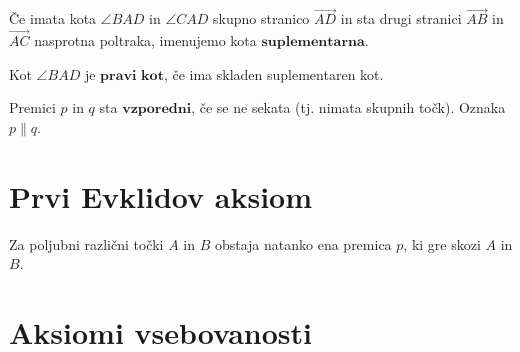 \begin{definicija}
    Če imata kota $\angle BAD$ in $\angle CAD$ skupno stranico $\overrightarrow{AD}$ in sta drugi stranici $\overrightarrow{AB}$ in $\overrightarrow{AC}$ nasprotna poltraka, imenujemo kota $\textbf{suplementarna}$.
\end{definicija}

\begin{definicija}
    Kot $\angle BAD$ je $\textbf{pravi kot}$, če ima skladen suplementaren kot.
\end{definicija}

\begin{definicija}
    Premici $p$ in $q$ sta $\textbf{vzporedni}$, če se ne sekata (tj. nimata skupnih točk). Oznaka $p\parallel q$.
\end{definicija}


\section*{Prvi Evklidov aksiom}

    \begin{aksiom}[E.1] 
        Za poljubni različni točki $A$ in $B$ obstaja natanko ena premica $p$, ki gre skozi $A$ in $B$.
    \end{aksiom}

        

\section{Aksiomi vsebovanosti}

